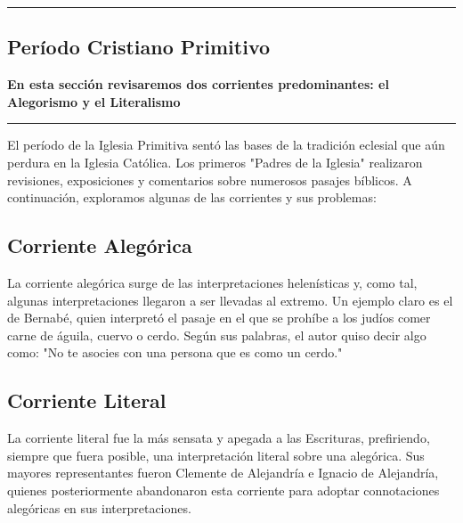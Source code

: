 {\color{gray}\hrule}
\begin{center}
\section{Período Cristiano Primitivo}
\textbf{En esta sección revisaremos dos corrientes predominantes: el Alegorismo y el Literalismo}
\end{center}
{\color{gray}\hrule}
\begin{multicols}{2}

El período de la Iglesia Primitiva sentó las bases de la tradición eclesial que aún perdura en la Iglesia Católica. Los primeros "Padres de la Iglesia" realizaron revisiones, exposiciones y comentarios sobre numerosos pasajes bíblicos. A continuación, exploramos algunas de las corrientes y sus problemas:

\subsection{Corriente Alegórica}

La corriente alegórica surge de las interpretaciones helenísticas y, como tal, algunas interpretaciones llegaron a ser llevadas al extremo. Un ejemplo claro es el de Bernabé, quien interpretó el pasaje en el que se prohíbe a los judíos comer carne de águila, cuervo o cerdo. Según sus palabras, el autor quiso decir algo como: "No te asocies con una persona que es como un cerdo."

\subsection{Corriente Literal}

La corriente literal fue la más sensata y apegada a las Escrituras, prefiriendo, siempre que fuera posible, una interpretación literal sobre una alegórica. Sus mayores representantes fueron Clemente de Alejandría e Ignacio de Alejandría, quienes posteriormente abandonaron esta corriente para adoptar connotaciones alegóricas en sus interpretaciones.

\end{multicols}
